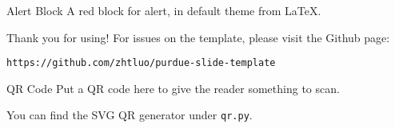 \documentclass{purdue-poster}
\begin{document}
\begin{frame}{}
\begin{columns}[c]
\begin{column}{.45\linewidth}
    \begin{alertblock}{Alert Block}
    A red block for alert, in default theme from \LaTeX.

    \bigskip
    
    \lipsum[2]
    \end{alertblock}

    \begin{block}{Thank you for using!}
        For issues on the template, please visit the Github page:
        
        {\small\texttt{https://github.com/zhtluo/purdue-slide-template}\par}
    \end{block}

    \begin{block}{\large QR Code}
        Put a QR code here to give the reader something to scan.

        You can find the SVG QR generator under \texttt{qr.py}.

        \begin{figure}
            {\centering}
        \end{figure}
    \end{block}
    \end{column}
    \end{columns}
    \vfill
\end{frame}
\end{document}
